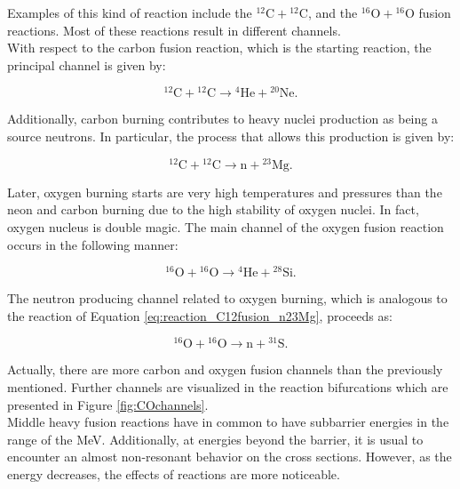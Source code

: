 \documentclass[openany]{book}
\begin{document}
Examples of this kind of reaction include the $\mathrm{{}^{12}C + {}^{12}C}$,   and the  $\mathrm{{}^{16}O + {}^{16}O}$ fusion reactions.   Most of these reactions result in different channels. \\


With respect to the carbon fusion reaction, which is the starting reaction,  the principal channel is given by: 

\begin{equation} \label{eq:reaction_C12fusion_alpha20Ne}
	\mathrm{{}^{12}C + {}^{12}C \rightarrow {}^{4}He + {}^{20}Ne}. 
\end{equation}

Additionally, carbon burning contributes to heavy nuclei production as being a source neutrons. In particular, the process that allows this production is given by:

\begin{equation} \label{eq:reaction_C12fusion_n23Mg}
	\mathrm{{}^{12}C + {}^{12}C \rightarrow n  + {}^{23}Mg}. 
\end{equation}

Later, oxygen burning starts are very high temperatures and pressures than the neon and carbon burning due to the high stability of oxygen nuclei. In fact, oxygen nucleus is double magic. The main channel of the oxygen fusion reaction occurs in the following manner:

\begin{equation} \label{eq:reaction_O12fusion_alpha28Si}
	\mathrm{{}^{16}O + {}^{16}O \rightarrow {}^{4}He + {}^{28}Si}. 
\end{equation}

The neutron producing channel related to oxygen burning, which is analogous to the reaction of Equation \ref{eq:reaction_C12fusion_n23Mg}, proceeds as: 

\begin{equation} \label{eq:reaction_O12fusion_n31S}
	\mathrm{{}^{16}O + {}^{16}O \rightarrow n + {}^{31}S}. 
\end{equation}

Actually, there are more carbon and oxygen fusion channels than the previously mentioned. Further channels are visualized in the reaction bifurcations which are presented in Figure \ref{fig:COchannels}. \\

Middle heavy fusion reactions have in common to have subbarrier energies in the range of the MeV. Additionally, at energies beyond the barrier, it is usual to encounter an almost non-resonant behavior on the cross sections. However, as the energy decreases, the effects of reactions are more noticeable. \\
\end{document}
